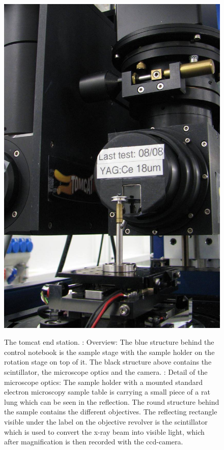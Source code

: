 \begin{figure}
{		\includegraphics[width=\imsize]{img/TOMCAT2}%
		\label{subfig:TOMCAT2}%
		}%
	\caption[The TOMCAT end station]{The \ac{tomcat} end station. : Overview: The blue structure behind the control notebook is the sample stage with the sample holder on the rotation stage on top of it. The black structure above contains the scintillator, the microscope optics and the camera. : Detail of the microscope optics: The sample holder with a mounted standard electron microscopy sample table is carrying a small piece of a rat lung which can be seen in the reflection. The round structure behind the sample contains the different objectives. The reflecting rectangle visible under the label on the objective revolver is the scintillator which is used to convert the x-ray beam into visible light, which after magnification is then recorded with the \ac{ccd}-camera.}%
	\label{fig:tomcat}
\end{figure}

